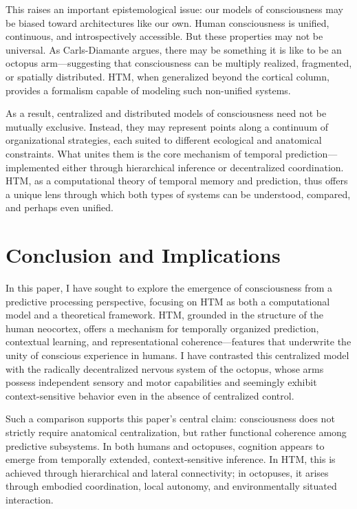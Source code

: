 \documentclass{article}
\begin{document}
This raises an important epistemological issue: our models of consciousness may be biased toward architectures like our own. Human consciousness is unified, continuous, and introspectively accessible. But these properties may not be universal. As Carls-Diamante \parencite{carls2022where} argues, there may be something it is like to be an octopus arm—suggesting that consciousness can be multiply realized, fragmented, or spatially distributed. HTM, when generalized beyond the cortical column, provides a formalism capable of modeling such non-unified systems.

As a result, centralized and distributed models of consciousness need not be mutually exclusive. Instead, they may represent points along a continuum of organizational strategies, each suited to different ecological and anatomical constraints. What unites them is the core mechanism of temporal prediction—implemented either through hierarchical inference or decentralized coordination. HTM, as a computational theory of temporal memory and prediction, thus offers a unique lens through which both types of systems can be understood, compared, and perhaps even unified.

\section{Conclusion and Implications}

In this paper, I have sought to explore the emergence of consciousness from a predictive processing perspective, focusing on HTM as both a computational model and a theoretical framework. HTM, grounded in the structure of the human neocortex, offers a mechanism for temporally organized prediction, contextual learning, and representational coherence—features that underwrite the unity of conscious experience in humans. I have contrasted this centralized model with the radically decentralized nervous system of the octopus, whose arms possess independent sensory and motor capabilities and seemingly exhibit context-sensitive behavior even in the absence of centralized control.

Such a comparison supports this paper's central claim: consciousness does not strictly require anatomical centralization, but rather functional coherence among predictive subsystems. In both humans and octopuses, cognition appears to emerge from temporally extended, context-sensitive inference. In HTM, this is achieved through hierarchical and lateral connectivity; in octopuses, it arises through embodied coordination, local autonomy, and environmentally situated interaction.
\end{document}
